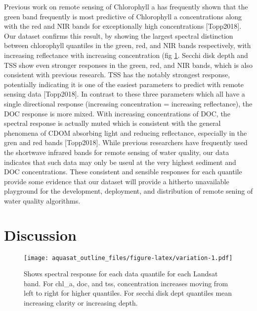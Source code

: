 \documentclass[]{article}
\begin{document}
Previous work on remote sensing of Chlorophyll a has frequently shown
that the green band frequently is most predictive of Chlorophyll a
concentrations along with the red and NIR bands for exceptionally high
concentrations {[}Topp2018{]}. Our dataset confirms this result, by
showing the largest spectral distinction between chlorophyll quantiles
in the green, red, and NIR bands respectively, with increasing
reflectance with increasing concentration (fig \ref{fig:captured}.
Secchi disk depth and TSS show even stronger responses in the green,
red, and NIR bands, which is also consistent with previous research. TSS
has the notably strongest response, potentially indicating it is one of
the easiest parameters to predict with remote sensing data
{[}Topp2018{]}. In contrast to these three parameters which all have a
single directional response (increasing concentration = increasing
reflectance), the DOC response is more mixed. With increasing
concentrations of DOC, the spectral response is actually muted which is
consistent with the general phenomena of CDOM absorbing light and
reducing reflectance, especially in the gren and red bands
{[}Topp2018{]}. While previous researchers have frequently used the
shortwave infrared bands for remote sensing of water quality, our data
indicates that such data may only be useul at the very highest sediment
and DOC concentrations. These consistent and sensible responses for each
quantile provide some evidence that our dataset will provide a hitherto
unavailable playground for the development, deployment, and distribution
of remote sening of water quality algorithms.

\hypertarget{discussion}{%
\section{Discussion}\label{discussion}}

\begin{figure}
\centering
\texttt{[image: aquasat\_outline\_files/figure-latex/variation-1.pdf]}
\caption{\label{fig:captured} Shows spectral response for each data
quantile for each Landsat band. For chl\_a, doc, and tss, concentration
increases moving from left to right for higher quantiles. For secchi
disk dept quantiles mean increasing clarity or increasing depth.}
\end{figure}
\end{document}
